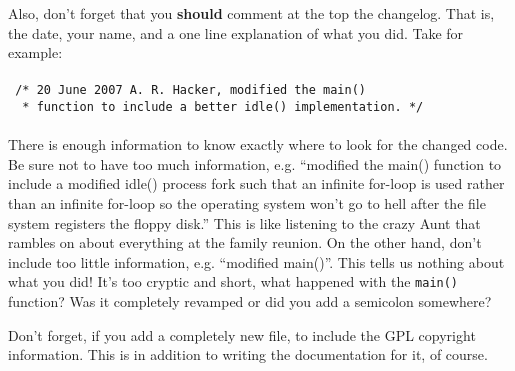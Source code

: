 Also, don't forget that you \textbf{should} comment at the top the changelog. That is, the date, your name, and a one line explanation of what you did. Take for example:
\\
\\
\verb| /* 20 June 2007 A. R. Hacker, modified the main()|
\\
\verb|  * function to include a better idle() implementation. */ |
\\
\\
There is enough information to know exactly where to look for the changed code. Be sure not to have too much information, e.g. ``modified the main() function to include a modified idle() process fork such that an infinite for-loop is used rather than an infinite for-loop so the operating system won't go to hell after the file system registers the floppy disk.'' This is like listening to the crazy Aunt that rambles on about everything at the family reunion. On the other hand, don't include too little information, e.g. ``modified main()''. This tells us nothing about what you did! It's too cryptic and short, what happened with the \verb|main()| function? Was it completely revamped or did you add a semicolon somewhere?

Don't forget, if you add a completely new file, to include the GPL copyright information. This is in addition to writing the documentation for it, of course.